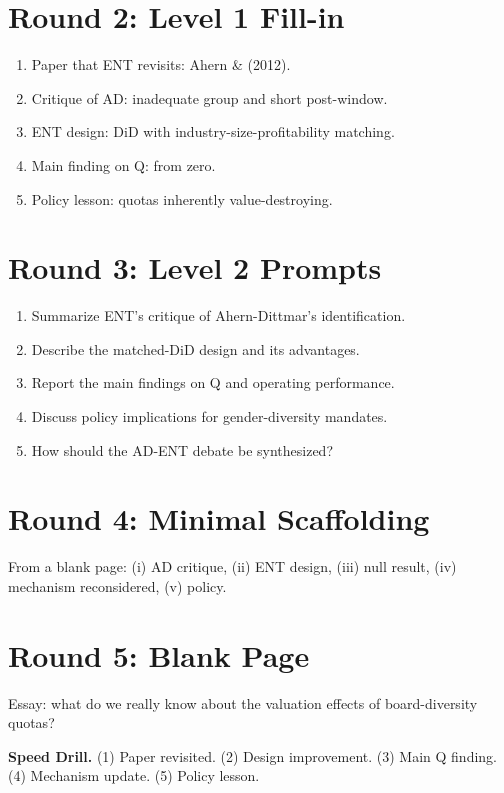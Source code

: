 \documentclass[11pt]{article}
\newcommand{\blank}[1]{\underline{\hspace{#1}}}
\begin{document}
\section*{Round 2: Level 1 Fill-in}
\begin{enumerate}
\item Paper that ENT revisits: Ahern \& \blank{1.5cm} (2012).
\item Critique of AD: inadequate \blank{2cm} group and short post-window.
\item ENT design: \blank{1.5cm} DiD with industry-size-profitability matching.
\item Main finding on Q: \blank{1.5cm} from zero.
\item Policy lesson: quotas \blank{1cm} inherently value-destroying.
\end{enumerate}

\section*{Round 3: Level 2 Prompts}
\begin{enumerate}
\item Summarize ENT's critique of Ahern-Dittmar's identification.
\item Describe the matched-DiD design and its advantages.
\item Report the main findings on Q and operating performance.
\item Discuss policy implications for gender-diversity mandates.
\item How should the AD-ENT debate be synthesized?
\end{enumerate}

\section*{Round 4: Minimal Scaffolding}
From a blank page: (i) AD critique, (ii) ENT design, (iii) null result, (iv) mechanism reconsidered, (v) policy.

\section*{Round 5: Blank Page}
Essay: what do we really know about the valuation effects of board-diversity quotas?

\vspace{6pt}
\begin{drillbox}
\textbf{Speed Drill.} (1) Paper revisited. (2) Design improvement. (3) Main Q finding. (4) Mechanism update. (5) Policy lesson.
\end{drillbox}
\end{document}
